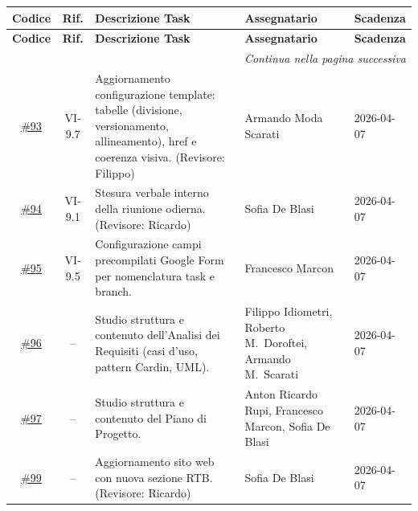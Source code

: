 \renewcommand{\arraystretch}{1.3}
\begin{longtable}{c c p{4.5cm} p{3cm} l}
    \toprule
    \textbf{Codice} & \textbf{Rif.} & \textbf{Descrizione Task} & \textbf{Assegnatario} & \textbf{Scadenza} \\
    \midrule
    \endfirsthead

    \toprule
    \textbf{Codice} & \textbf{Rif.} & \textbf{Descrizione Task} & \textbf{Assegnatario} & \textbf{Scadenza} \\
    \midrule
    \endhead

    \midrule
    \multicolumn{5}{r}{\textit{Continua nella pagina successiva}} \\
    \midrule
    \endfoot

    \bottomrule
    \endlastfoot

    \href{https://github.com/Synergo-Unit-UniPD/Second-Brain/issues/93}{\underline{\#93}} & VI-9.7
        & {Aggiornamento configurazione template: tabelle (divisione,
           versionamento, allineamento), href e coerenza visiva.
           (Revisore: Filippo)}
        & Armando Moda Scarati & 2026-04-07 \\[4pt]

    \href{https://github.com/Synergo-Unit-UniPD/Second-Brain/issues/94}{\underline{\#94}} & VI-9.1
        & {Stesura verbale interno della riunione odierna.
           (Revisore: Ricardo)}
        & Sofia De Blasi & 2026-04-07 \\[4pt]

    \href{https://github.com/Synergo-Unit-UniPD/Second-Brain/issues/95}{\underline{\#95}} & VI-9.5
        & {Configurazione campi precompilati Google Form per nomenclatura
           task e branch.}
        & Francesco Marcon & 2026-04-07 \\[4pt]

    \href{https://github.com/Synergo-Unit-UniPD/Second-Brain/issues/96}{\underline{\#96}} & --
        & {Studio struttura e contenuto dell'Analisi dei Requisiti
           (casi d'uso, pattern Cardin, UML).}
        & Filippo Idiometri, Roberto M.\ Doroftei, Armando M.\ Scarati & 2026-04-07 \\[4pt]

    \href{https://github.com/Synergo-Unit-UniPD/Second-Brain/issues/97}{\underline{\#97}} & --
        & {Studio struttura e contenuto del Piano di Progetto.}
        & Anton Ricardo Rupi, Francesco Marcon, Sofia De Blasi & 2026-04-07 \\[4pt]
	
	\href{https://github.com/Synergo-Unit-UniPD/Second-Brain/issues/99}{\underline{\#99}} & --
	& {Aggiornamento sito web con nuova sezione RTB.
		(Revisore: Ricardo)}
	& Sofia De Blasi & 2026-04-07 \\
\end{longtable}

